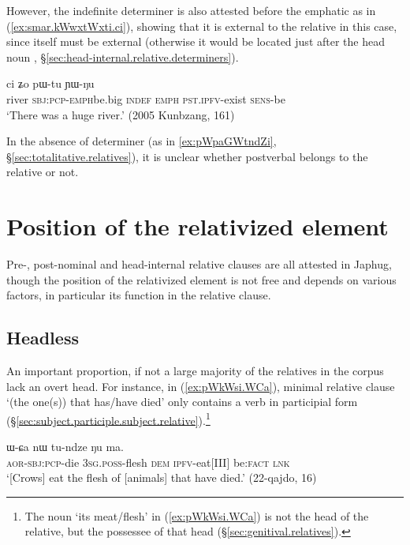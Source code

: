 However, the indefinite determiner  is also attested before the emphatic  as in (\ref{ex:smar.kWwxtWxti.ci}), showing that it is external to the relative in this case, since  itself must be external (otherwise it would be located just after the head noun , §\ref{sec:head-internal.relative.determiners}).

\begin{exe}
\ex \label{ex:smar.kWwxtWxti.ci}
 ci ʑo pɯ-tu ɲɯ-ŋu \\
river \textsc{sbj}:\textsc{pcp}-\textsc{emph}\redp{}be.big \textsc{indef} \textsc{emph} \textsc{pst}.\textsc{ipfv}-exist \textsc{sens}-be \\
\glt `There was a huge river.' (2005 Kunbzang, 161)
\end{exe} 

In the absence of determiner (as in \ref{ex:pWpaGWtndZi}, §\ref{sec:totalitative.relatives}), it is unclear whether postverbal  belongs to the relative or not.

\section{Position of the relativized element} \label{sec:position.head.relative}
Pre-, post-nominal and head-internal relative clauses are all attested in Japhug, though the position of the relativized element is not free and depends on various factors, in particular its function in the relative clause.

\subsection{Headless} \label{sec:headless.relative}
An important proportion, if not a large majority of the relatives in the corpus lack an overt head. For instance, in (\ref{ex:pWkWsi.WCa}), minimal relative clause  `(the one(s)) that has/have died' only contains a verb in participial form (§\ref{sec:subject.participle.subject.relative}).\footnote{The noun  `its meat/flesh' in (\ref{ex:pWkWsi.WCa}) is not the head of the relative, but the possessee of that head (§\ref{sec:genitival.relatives}). }

\begin{exe}
\ex \label{ex:pWkWsi.WCa}
\gll [pɯ-kɯ-si] ɯ-ɕa nɯ tu-ndze ŋu ma. \\
\textsc{aor}-\textsc{sbj}:\textsc{pcp}-die \textsc{3sg}.\textsc{poss}-flesh \textsc{dem} \textsc{ipfv}-eat[III] be:\textsc{fact} \textsc{lnk} \\
\glt `[Crows] eat the flesh of [animals] that have died.' (22-qajdo, 16)
\end{exe} 


